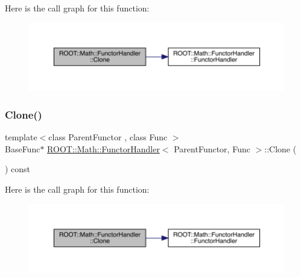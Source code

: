Here is the call graph for this function\+:
\nopagebreak
\begin{figure}[H]
\begin{center}
\leavevmode
\includegraphics[width=350pt]{d8/d4b/classROOT_1_1Math_1_1FunctorHandler_ad20fb7defe76e6abc244eff203aabbc6_cgraph}
\end{center}
\end{figure}
\mbox{\label{classROOT_1_1Math_1_1FunctorHandler_ad20fb7defe76e6abc244eff203aabbc6}} 
\subsubsection{\texorpdfstring{Clone()}{Clone()}\hspace{0.1cm}{\footnotesize\ttfamily [2/2]}}
{\footnotesize\ttfamily template$<$class Parent\+Functor , class Func $>$ \\
Base\+Func$\ast$ \mbox{\hyperlink{classROOT_1_1Math_1_1FunctorHandler}{R\+O\+O\+T\+::\+Math\+::\+Functor\+Handler}}$<$ Parent\+Functor, Func $>$\+::Clone (\begin{DoxyParamCaption}{ }\end{DoxyParamCaption}) const\hspace{0.3cm}{\ttfamily [inline]}}

Here is the call graph for this function\+:
\nopagebreak
\begin{figure}[H]
\begin{center}
\leavevmode
\includegraphics[width=350pt]{d8/d4b/classROOT_1_1Math_1_1FunctorHandler_ad20fb7defe76e6abc244eff203aabbc6_cgraph}
\end{center}
\end{figure}
\mbox{\label{classROOT_1_1Math_1_1FunctorHandler_a448b3a68a8b9a55489a0b33b4cb26c93}} 
